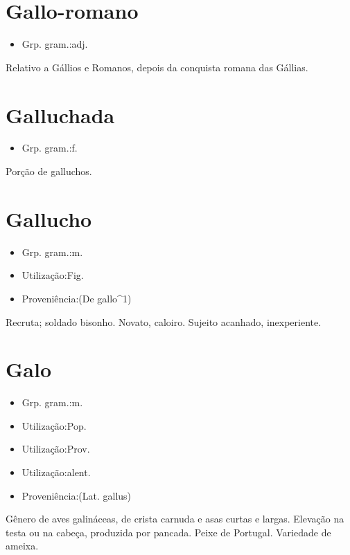 \section{Gallo-romano}
\begin{itemize}
\item {Grp. gram.:adj.}
\end{itemize}
Relativo a Gállios e Romanos, depois da conquista romana das Gállias.
\section{Galluchada}
\begin{itemize}
\item {Grp. gram.:f.}
\end{itemize}
Porção de galluchos.
\section{Gallucho}
\begin{itemize}
\item {Grp. gram.:m.}
\end{itemize}
\begin{itemize}
\item {Utilização:Fig.}
\end{itemize}
\begin{itemize}
\item {Proveniência:(De \textunderscore gallo\textunderscore ^1)}
\end{itemize}
Recruta; soldado bisonho.
Novato, caloiro.
Sujeito acanhado, inexperiente.
\section{Galo}
\begin{itemize}
\item {Grp. gram.:m.}
\end{itemize}
\begin{itemize}
\item {Utilização:Pop.}
\end{itemize}
\begin{itemize}
\item {Utilização:Prov.}
\end{itemize}
\begin{itemize}
\item {Utilização:alent.}
\end{itemize}
\begin{itemize}
\item {Proveniência:(Lat. \textunderscore gallus\textunderscore )}
\end{itemize}
Gênero de aves galináceas, de crista carnuda e asas curtas e largas.
Elevação na testa ou na cabeça, produzida por pancada.
Peixe de Portugal.
Variedade de ameixa.
